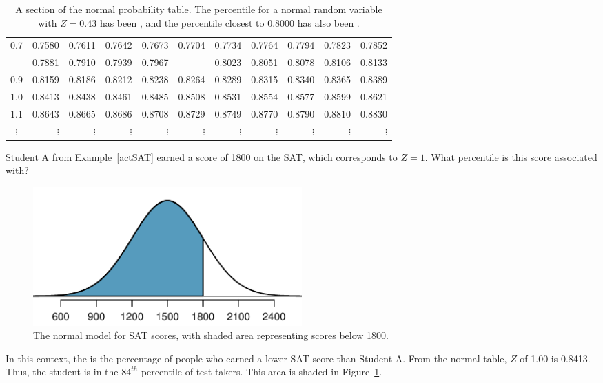 \begin{table}
\begin{tabular}{c | rrrrr | rrrrr |}
		0.7 & \scriptsize{0.7580} & \scriptsize{0.7611} & \scriptsize{0.7642} & \scriptsize{0.7673} & \scriptsize{0.7704} & \scriptsize{0.7734} & \scriptsize{0.7764} & \scriptsize{0.7794} & \scriptsize{0.7823} & \scriptsize{0.7852} \\
		\highlightO{0.8} & \scriptsize{0.7881} & \scriptsize{0.7910} & \scriptsize{0.7939} & \scriptsize{0.7967} & \highlightO{\scriptsize{0.7995}} & \scriptsize{0.8023} & \scriptsize{0.8051} & \scriptsize{0.8078} & \scriptsize{0.8106} & \scriptsize{0.8133} \\
		0.9 & \scriptsize{0.8159} & \scriptsize{0.8186} & \scriptsize{0.8212} & \scriptsize{0.8238} & \scriptsize{0.8264} & \scriptsize{0.8289} & \scriptsize{0.8315} & \scriptsize{0.8340} & \scriptsize{0.8365} & \scriptsize{0.8389} \\
		\hline
		\hline
		1.0 & \scriptsize{0.8413} & \scriptsize{0.8438} & \scriptsize{0.8461} & \scriptsize{0.8485} & \scriptsize{0.8508} & \scriptsize{0.8531} & \scriptsize{0.8554} & \scriptsize{0.8577} & \scriptsize{0.8599} & \scriptsize{0.8621} \\
		1.1 & \scriptsize{0.8643} & \scriptsize{0.8665} & \scriptsize{0.8686} & \scriptsize{0.8708} & \scriptsize{0.8729} & \scriptsize{0.8749} & \scriptsize{0.8770} & \scriptsize{0.8790} & \scriptsize{0.8810} & \scriptsize{0.8830} \\
		$\vdots$ &   $\vdots$ &   $\vdots$ &   $\vdots$ &   $\vdots$ &   $\vdots$ &   $\vdots$ &   $\vdots$ &   $\vdots$ &   $\vdots$ &   $\vdots$ \\
		\hline
	\end{tabular}
	\caption{A section of the normal probability table. The percentile for a normal random variable with $Z=0.43$ has been , and the percentile closest to 0.8000 has also been .}
	\label{zTableShort}
\end{table}

\begin{example}{Student A from Example~\ref{actSAT} earned a score of 1800 on the SAT, which corresponds to $Z=1$. What percentile is this score associated with?
		\begin{figure}[h!]
			\centering
			\includegraphics[width=0.5\textwidth]{ch_distributions_oi_biostat/figures/satBelow1800/satBelow1800}
			\caption{The normal model for SAT scores, with shaded area representing scores below 1800.}
			\label{satBelow1800}
		\end{figure}
		
		}
In this context, the  is the percentage of people who earned a lower SAT score than Student A. From the normal table, $Z$ of 1.00 is 0.8413. Thus, the student is in the $84^{th}$ percentile of test takers. This area is shaded in Figure~\ref{satBelow1800}.
\end{example}


